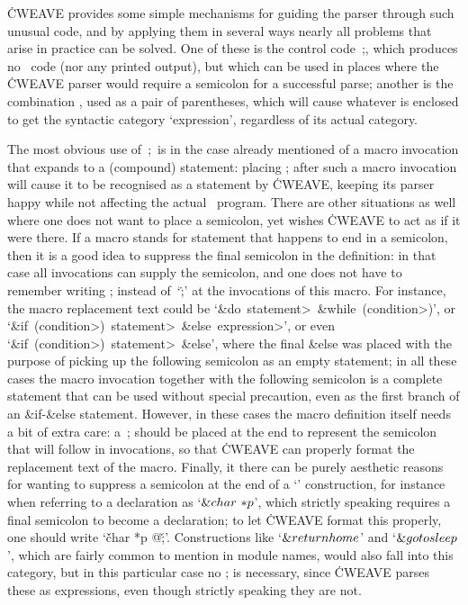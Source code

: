 \.{CWEAVE} provides some simple mechanisms for guiding the parser through
such unusual code, and by applying them in several ways nearly all problems
that arise in practice can be solved. One of these is the control code~\:;,
which produces no \Cee~code (nor any printed output), but which can be used
in places where the \.{CWEAVE} parser would require a semicolon for a
successful parse; another is the combination \:[,~\dots,~\:], used as
a pair of parentheses, which will cause whatever is enclosed to get the
syntactic category `expression', regardless of its actual category.

The most obvious use of~\:;\ is in the case already mentioned of a macro
invocation that expands to a (compound) statement: placing \:; after such a
macro invocation will cause it to be recognised as a statement by \.{CWEAVE},
keeping its parser happy while not affecting the actual \Cee~program. There
are other situations as well where one does not want to place a semicolon,
yet wishes \.{CWEAVE} to act as if it were there. If a macro stands for
statement that happens to end in a semicolon, then it is a good idea to
suppress the final semicolon in the definition: in that case all invocations
can supply the semicolon, and one does not have to remember writing \:;
instead of~`\.;' at the invocations of this macro. For instance, the macro
replacement text could be `\&{do}~\<statement>~\&{while}~(\<condition>)', or
`\&{if}~(\<condition>)~\<statement>~\&{else}~\<expression>', or even
`\&{if}~(\<condition>)~\<statement>~\&{else}', where the final \&{else} was
placed with the purpose of picking up the following semicolon as an empty
statement; in all these cases the macro invocation together with the
following semicolon is a complete statement that can be used without special
precaution, even as the first branch of an \&{if}-\&{else} statement.
However, in these cases the macro definition itself needs a bit of extra
care: a~\:; should be placed at the end to represent the semicolon that will
follow in invocations, so that \.{CWEAVE} can properly format the
replacement text of the macro. Finally, it there can be purely aesthetic
reasons for wanting to suppress a semicolon at the end of a `\pb'
construction, for instance when referring to a declaration as
`$\&{char}~\mathord{*}p$', which strictly speaking requires a final semicolon to
become a declaration; to let \.{CWEAVE} format this properly, one should
write `\.{\v char *p @;\v}'. Constructions like `$\&{return}~\\{home}$' and
`$\&{goto}~\\{sleep}$', which are fairly common to mention in module names,
would also fall into this category, but in this particular case no \:; is
necessary, since \.{CWEAVE} parses these as expressions, even though strictly
speaking they are not.

